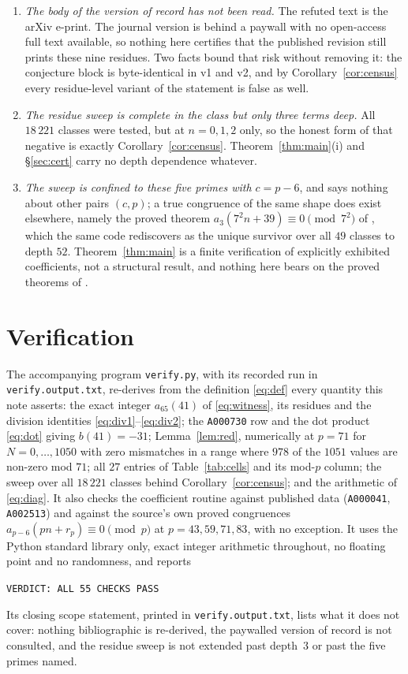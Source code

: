 \documentclass[11pt]{amsart}
\theoremstyle{definition}
\theoremstyle{remark}
\begin{document}
\begin{enumerate}
\item[(W1)] \emph{The body of the version of record has not been read.} The refuted text
is the arXiv e-print. The journal version is behind a paywall with no open-access full text
available, so nothing here certifies that the published revision still prints these nine
residues. Two facts bound that risk without removing it: the conjecture block is
byte-identical in v1 and v2, and by Corollary~\ref{cor:census} every residue-level variant
of the statement is false as well.
\item[(W2)] \emph{The residue sweep is complete in the class but only three terms deep.}
All $18\,221$ classes were tested, but at $n=0,1,2$ only, so the honest form of that
negative is exactly Corollary~\ref{cor:census}. Theorem~\ref{thm:main}(i) and
\S\ref{sec:cert} carry no depth dependence whatever.
\item[(W3)] \emph{The sweep is confined to these five primes with $c=p-6$}, and says
nothing about other pairs $(c,p)$; a true congruence of the same shape does exist
elsewhere, namely the proved theorem $a_3(7^2n+39)\equiv0\pmod{7^2}$ of \cite{DMS}, which
the same code rediscovers as the unique survivor over all $49$ classes to depth $52$.
Theorem~\ref{thm:main} is a finite verification of explicitly exhibited coefficients, not a
structural result, and nothing here bears on the proved theorems of \cite{DMS}.
\end{enumerate}

\section{Verification}

The accompanying program \texttt{verify.py}, with its recorded run in
\texttt{verify.output.txt}, re-derives from the definition \eqref{eq:def} every quantity
this note asserts: the exact integer $a_{65}(41)$ of \eqref{eq:witness}, its residues and
the division identities \eqref{eq:div1}--\eqref{eq:div2}; the \texttt{A000730} row and the
dot product \eqref{eq:dot} giving $b(41)=-31$; Lemma~\ref{lem:red}, numerically at $p=71$
for $N=0,\dots,1050$ with zero mismatches in a range where $978$ of the $1051$ values are
non-zero mod $71$; all $27$ entries of Table~\ref{tab:cells} and its mod-$p$ column; the
sweep over all $18\,221$ classes behind Corollary~\ref{cor:census}; and the arithmetic of
\eqref{eq:diag}. It also checks the coefficient routine against published data
(\texttt{A000041}, \texttt{A002513}) and against the source's own proved congruences
$a_{p-6}(pn+r_p)\equiv0\pmod p$ at $p=43,59,71,83$, with no exception. It uses the Python
standard library only, exact integer arithmetic throughout, no floating point and no
randomness, and reports
\begin{center}\texttt{VERDICT: ALL 55 CHECKS PASS}\end{center}
Its closing scope statement, printed in \texttt{verify.output.txt}, lists what it does
not cover: nothing bibliographic is re-derived, the paywalled version of record is not
consulted, and the residue sweep is not extended past depth~$3$ or past the five primes
named.
\end{document}
